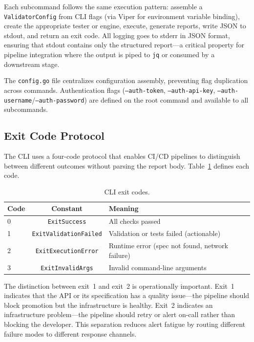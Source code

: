 Each subcommand follows the same execution pattern: assemble a \texttt{ValidatorConfig} from CLI flags (via Viper for environment variable binding), create the appropriate tester or engine, execute, generate reports, write JSON to stdout, and return an exit code. All logging goes to stderr in JSON format, ensuring that stdout contains only the structured report---a critical property for pipeline integration where the output is piped to \texttt{jq} or consumed by a downstream stage.

The \texttt{config.go} file centralizes configuration assembly, preventing flag duplication across commands. Authentication flags (\texttt{--auth-token}, \texttt{--auth-api-key}, \texttt{--auth-username}/\texttt{--auth-password}) are defined on the root command and available to all subcommands.

\subsection{Exit Code Protocol}
\label{subsec:exit-codes}

The CLI uses a four-code protocol that enables CI/CD pipelines to distinguish between different outcomes without parsing the report body. Table~\ref{tab:exit-codes} defines each code.

\begin{table}[htbp]
\centering
\caption{CLI exit codes.}
\label{tab:exit-codes}
\small
\begin{tabular}{@{}lcl@{}}
\toprule
\textbf{Code} & \textbf{Constant} & \textbf{Meaning} \\
\midrule
0 & \texttt{ExitSuccess}          & All checks passed \\
1 & \texttt{ExitValidationFailed} & Validation or tests failed (actionable) \\
2 & \texttt{ExitExecutionError}   & Runtime error (spec not found, network failure) \\
3 & \texttt{ExitInvalidArgs}      & Invalid command-line arguments \\
\bottomrule
\end{tabular}
\end{table}

The distinction between exit~1 and exit~2 is operationally important. Exit~1 indicates that the API or its specification has a quality issue---the pipeline should block promotion but the infrastructure is healthy. Exit~2 indicates an infrastructure problem---the pipeline should retry or alert on-call rather than blocking the developer. This separation reduces alert fatigue by routing different failure modes to different response channels.

